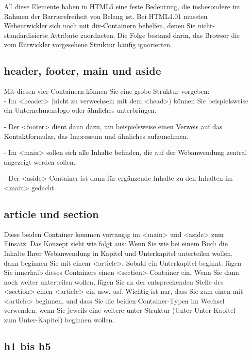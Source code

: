 All diese Elemente haben in HTML5 eine feste Bedeutung, die insbesondere im Rahmen der Barrierefreiheit von Belang ist. Bei HTML4.01 mussten Webentwickler sich noch mit div-Containern behelfen, denen Sie nicht-standardisierte Attribute zuordneten. Die Folge bestand darin, das Browser die vom Entwickler vorgesehene Struktur häufig ignorierten.

\subsection{header, footer, main und aside}

Mit diesen vier Containern können Sie eine grobe Struktur vorgeben: \\

-	Im <header> (nicht zu verwechseln mit dem <head>) können Sie beispielsweise ein Unternehmenslogo oder ähnliches unterbringen.

-	Der <footer> dient dann dazu, um beispielsweise einen Verweis auf das Kontaktformular, das Impressum und ähnliches aufzunehmen.

-	Im <main> sollen sich alle Inhalte befinden, die auf der Webanwendung zentral angezeigt werden sollen.

-	Der <aside>-Container ist dann für ergänzende Inhalte zu den Inhalten im <main> gedacht.

\subsection{article und section}

Diese beiden Container kommen vorrangig im <main> und <aside> zum Einsatz. Das Konzept sieht wie folgt aus: Wenn Sie wie bei einem Buch die Inhalte Ihrer Webanwendung in Kapitel und Unterkapitel unterteilen wollen, dann beginnen Sie mit einem <article>. Sobald ein Unterkapitel beginnt, fügen Sie innerhalb dieses Containers einen <section>-Container ein. Wenn Sie dann noch weiter unterteilen wollen, fügen Sie an der entsprechenden Stelle des <section> einen <article> ein usw. usf. Wichtig  ist nur, dass Sie zum einen mit <article> beginnen, und dass Sie die beiden Container-Typen im Wechsel verwenden, wenn Sie jeweils eine weitere unter-Struktur (Unter-Unter-Kapitel zum Unter-Kapitel) beginnen wollen.

\subsection{h1 bis h5}

